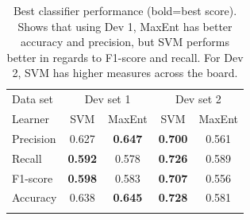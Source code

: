 \begin{table}[t!]
	\centering
	\begin{tabular}{l|cc|cc} 
	\noalign{\smallskip}\hline\noalign{\smallskip}
	Data set & \multicolumn{2}{c|}{Dev set 1} & \multicolumn{2}{c}{Dev set 2} \\
	Learner  & SVM    & MaxEnt & SVM    & MaxEnt \\
	\noalign{\smallskip}\hline\noalign{\smallskip}
	Precision  & 0.627  & {\bf 0.647}   & {\bf 0.700}  & 0.561 \\
	Recall       & {\bf 0.592}  & 0.578  & {\bf 0.726}  & 0.589 \\
	F1-score  & {\bf 0.598}  & 0.583  & {\bf 0.707}  & 0.556 \\
	Accuracy & 0.638  & {\bf 0.645}  & {\bf 0.728}  & 0.581 \\
	\noalign{\smallskip}\hline\noalign{\smallskip}
	\end{tabular}
	\caption[Best classifier performance]{Best classifier performance {\small (bold=best score)}. Shows that using Dev 1, MaxEnt has better accuracy and precision, but SVM performs better in regards to F1-score and recall. For Dev 2, SVM has higher measures across the board.}
	\label{tab:performance}
\end{table}

